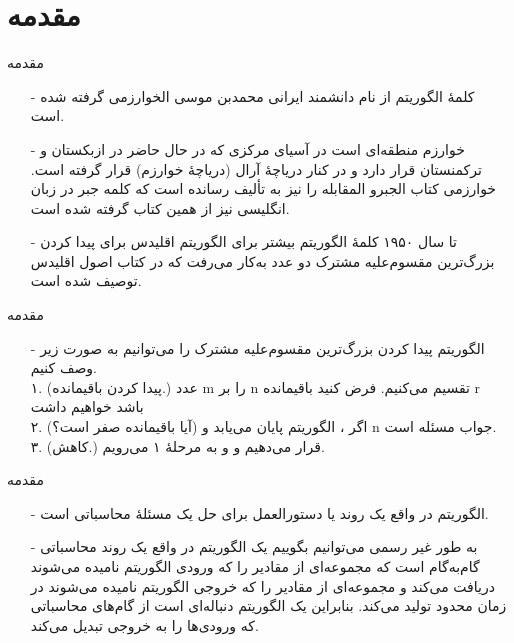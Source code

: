 \section{مقدمه}


\begin{frame}{مقدمه}
\begin{itemize}\itemr
\item[-]
کلمهٔ الگوریتم از نام دانشمند ایرانی محمدبن موسی الخوارزمی گرفته شده است.
\item[-]
خوارزم منطقه‌ای است در آسیای مرکزی که در حال حاضر در ازبکستان و ترکمنستان قرار دارد و در کنار دریاچهٔ آرال (دریاچهٔ خوارزم) قرار گرفته است. خوارزمی کتاب الجبرو المقابله را نیز به تألیف رسانده است که کلمه جبر
در زبان انگلیسی نیز از همین کتاب گرفته شده است.
\item[-]
تا سال ۱۹۵۰ کلمهٔ الگوریتم بیشتر برای الگوریتم اقلیدس
برای پیدا کردن بزرگ‌ترین مقسوم‌علیه مشترک
دو عدد به‌کار می‌رفت که در کتاب اصول اقلیدس
توصیف شده است.
\end{itemize}
\end{frame}


\begin{frame}{مقدمه}
\begin{itemize}\itemr
\item[-]
الگوریتم پیدا کردن بزرگ‌ترین مقسوم‌علیه مشترک را می‌توانیم به صورت زیر وصف کنیم.\\
۱. (پیدا کردن باقیمانده.) عدد
m
را بر
n
تقسیم می‌کنیم. فرض کنید باقیمانده
r 
باشد خواهیم داشت
\\
۲. (آیا باقیمانده صفر است؟) اگر
، الگوریتم پایان می‌یابد و
n
جواب مسئله است.\\
۳. (کاهش.) قرار می‌دهیم
و
و به مرحلهٔ ۱ می‌رویم.
\end{itemize}
\end{frame}


\begin{frame}{مقدمه}
\begin{itemize}\itemr
\item[-]
الگوریتم در واقع یک روند
یا دستورالعمل
برای حل یک مسئلهٔ محاسباتی است.
\item[-]
به طور غیر رسمی می‌توانیم بگوییم یک الگوریتم در واقع یک روند محاسباتی گام‌به‌گام است که مجموعه‌ای از مقادیر را که ورودی الگوریتم نامیده می‌شوند دریافت می‌کند و مجموعه‌ای از مقادیر را که خروجی الگوریتم نامیده می‌شوند در زمان محدود تولید می‌کند. بنابراین یک الگوریتم دنباله‌ای است از گام‌های محاسباتی که ورودی‌ها را به خروجی تبدیل می‌کند.
\end{itemize}
\end{frame}


